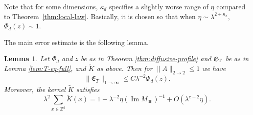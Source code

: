 \documentclass[11pt]{amsart}
\def\Z{{\mathbb{Z}}}
\newcommand{\Impt}{\operatorname*{Im}}
\numberwithin{equation}{section}
\numberwithin{theorem}{section}
\newtheorem{lemma}[theorem]{Lemma}
\begin{document}
Note that for some  dimensions, $\kappa_d$ specifies a slightly worse range of $\eta$ compared to Theorem~\ref{thm:local-law}. Basically, it is chosen so that when $\eta\sim \lambda^{2+\kappa_d}$, $\Phi_d(z)\sim 1$.

The main error estimate is the following lemma.
\begin{lemma}
\label{lem:T-eq-error-estimate}
Let $\Phi_d$ and $z$ be as in Theorem \ref{thm:diffusive-profile} and $\mathfrak{E}_{\rm T}$ be as in Lemma \ref{lem:T-eq-full}, and $\tilde{K}$ as above.  Then for $\|A\|_{2\to 2} \leq 1$ we have
\begin{equation}
\label{eq:Emaxentry}
\|\mathfrak{E}_T\|_{1\to\infty}\leq C\lambda^{-2}\Phi_d(z).
\end{equation}
Moreover, the kernel $\tilde{K}$ satisfies
\begin{equation}
\label{eq:walk-mass}
\lambda^2 \sum_{x\in \Z^d} \tilde{K}(x)=1 - \lambda^{-2}\eta (\Impt M_{00})^{-1} + O(\lambda^{c-2}\eta).
\end{equation}
\end{lemma}
\end{document}
